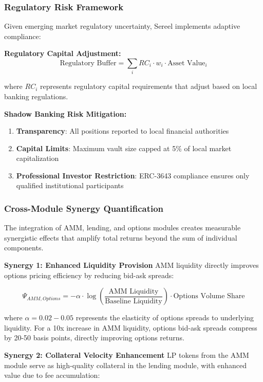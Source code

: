 \documentclass[12pt]{article}
\begin{document}
\subsubsection{Regulatory Risk Framework}

Given emerging market regulatory uncertainty, Sereel implements adaptive compliance:

\textbf{Regulatory Capital Adjustment:}
\begin{equation}
\text{Regulatory Buffer} = \sum_i RC_i \cdot w_i \cdot \text{Asset Value}_i
\end{equation}

where $RC_i$ represents regulatory capital requirements that adjust based on local banking regulations.

\textbf{Shadow Banking Risk Mitigation:}
\begin{enumerate}
\item \textbf{Transparency}: All positions reported to local financial authorities
\item \textbf{Capital Limits}: Maximum vault size capped at 5\% of local market capitalization
\item \textbf{Professional Investor Restriction}: ERC-3643 compliance ensures only qualified institutional participants
\end{enumerate}

\subsubsection{Cross-Module Synergy Quantification}

The integration of AMM, lending, and options modules creates measurable synergistic effects that amplify total returns beyond the sum of individual components.

\textbf{Synergy 1: Enhanced Liquidity Provision}
AMM liquidity directly improves options pricing efficiency by reducing bid-ask spreads:

\begin{equation}
\Psi_{AMM,Options} = -\alpha \cdot \log\left(\frac{\text{AMM Liquidity}}{\text{Baseline Liquidity}}\right) \cdot \text{Options Volume Share}
\end{equation}

where $\alpha = 0.02-0.05$ represents the elasticity of options spreads to underlying liquidity. For a 10x increase in AMM liquidity, options bid-ask spreads compress by 20-50 basis points, directly improving options returns.

\textbf{Synergy 2: Collateral Velocity Enhancement}
LP tokens from the AMM module serve as high-quality collateral in the lending module, with enhanced value due to fee accumulation:
\end{document}
